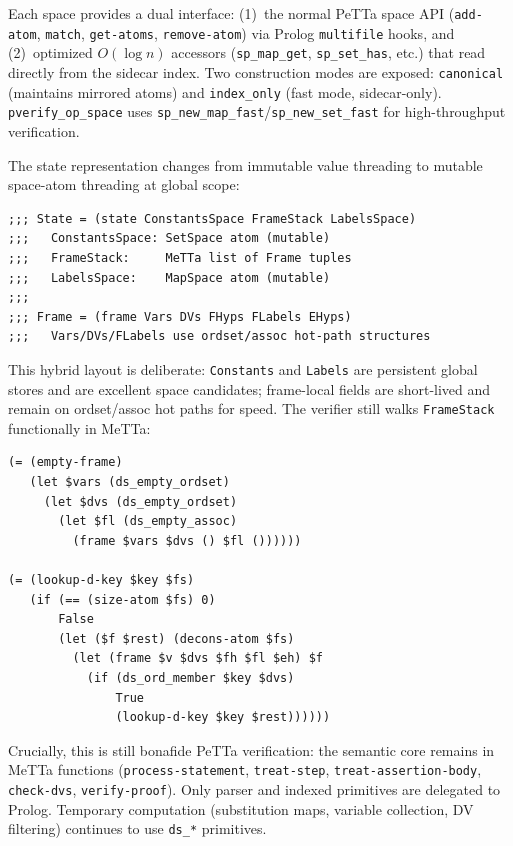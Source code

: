 \documentclass[11pt]{article}
\begin{document}
Each space provides a dual interface:
(1)~the normal PeTTa space API (\texttt{add-atom},
\texttt{match}, \texttt{get-atoms}, \texttt{remove-atom}) via
Prolog \texttt{multifile} hooks, and
(2)~optimized $O(\log n)$ accessors
(\texttt{sp\_map\_get}, \texttt{sp\_set\_has}, etc.) that read
directly from the sidecar index.
Two construction modes are exposed:
\texttt{canonical} (maintains mirrored atoms) and
\texttt{index\_only} (fast mode, sidecar-only).
\texttt{pverify\_op\_space} uses
\texttt{sp\_new\_map\_fast}/\texttt{sp\_new\_set\_fast} for
high-throughput verification.

The state representation changes from immutable value threading
to mutable space-atom threading at global scope:

\begin{lstlisting}[language=MeTTa,caption={Space-backed state representation.}]
;;; State = (state ConstantsSpace FrameStack LabelsSpace)
;;;   ConstantsSpace: SetSpace atom (mutable)
;;;   FrameStack:     MeTTa list of Frame tuples
;;;   LabelsSpace:    MapSpace atom (mutable)
;;;
;;; Frame = (frame Vars DVs FHyps FLabels EHyps)
;;;   Vars/DVs/FLabels use ordset/assoc hot-path structures
\end{lstlisting}

This hybrid layout is deliberate:
\texttt{Constants} and \texttt{Labels} are persistent global stores
and are excellent space candidates; frame-local fields are short-lived
and remain on ordset/assoc hot paths for speed.
The verifier still walks \texttt{FrameStack} functionally in MeTTa:

\begin{lstlisting}[language=MeTTa,caption={Frame stack traversal with space-backed fields.}]
(= (empty-frame)
   (let $vars (ds_empty_ordset)
     (let $dvs (ds_empty_ordset)
       (let $fl (ds_empty_assoc)
         (frame $vars $dvs () $fl ())))))

(= (lookup-d-key $key $fs)
   (if (== (size-atom $fs) 0)
       False
       (let ($f $rest) (decons-atom $fs)
         (let (frame $v $dvs $fh $fl $eh) $f
           (if (ds_ord_member $key $dvs)
               True
               (lookup-d-key $key $rest))))))
\end{lstlisting}

Crucially, this is still bonafide PeTTa verification:
the semantic core remains in MeTTa functions
(\texttt{process-statement}, \texttt{treat-step},
\texttt{treat-assertion-body}, \texttt{check-dvs},
\texttt{verify-proof}).
Only parser and indexed primitives are delegated to Prolog.
Temporary computation (substitution maps, variable collection,
DV filtering) continues to use \texttt{ds\_*} primitives.
\end{document}
